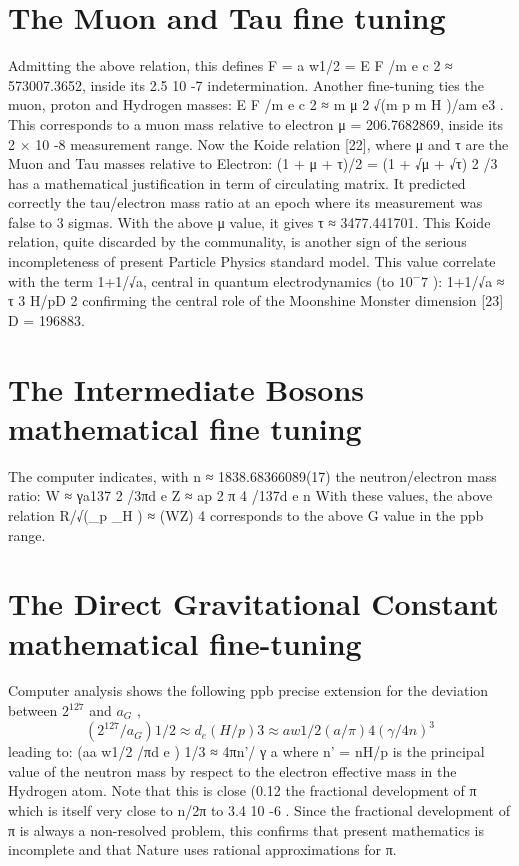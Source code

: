 \section {The Muon and Tau fine tuning}

Admitting the above relation, this defines F = a w1/2 = E F /m e c 2 ≈ 573007.3652, inside its 2.5 10 -7
indetermination. Another fine-tuning ties the muon, proton and Hydrogen masses: E F /m e c 2 ≈
m μ 2 √(m p m H )/am e3 . This corresponds to a muon mass relative to electron μ = 206.7682869, inside its
2 × 10 -8 measurement range.
Now the Koide relation [22], where μ and τ are the Muon and Tau masses relative to Electron:
(1 + μ + τ)/2 = (1 + √μ + √τ) 2 /3
has a mathematical justification in term of circulating matrix. It predicted correctly the tau/electron
mass ratio at an epoch where its measurement was false to 3 sigmas. With the above μ value, it
gives τ ≈ 3477.441701. This Koide relation, quite discarded by the communality, is another sign of
the serious incompleteness of present Particle Physics standard model. This value correlate with the
term 1+1/√a, central in quantum electrodynamics (to $10^-7$ ):
1+1/√a ≈ τ 3 H/pD 2
confirming the central role of the Moonshine Monster dimension [23] D = 196883.

\section {The Intermediate Bosons mathematical fine tuning}

The computer indicates, with n ≈ 1838.68366089(17) the neutron/electron mass ratio:
W ≈ γa137 2 /3πd e
Z ≈ ap 2 π 4 /137d e n
With these values, the above relation R/√(\lambdabar_p \lambdabar_H ) ≈ (WZ) 4 corresponds to the above G value in the
ppb range.

\section {The Direct Gravitational Constant mathematical fine-tuning}

Computer analysis shows the following ppb precise extension for the deviation between $2^127$ and
$a_G$ ,
$$(2^127 /a_G ) 1/2 ≈ d_e (H/p) 3 ≈ a w1/2 (a/ π ) 4 ( γ /4n)^3$$
leading to:
(aa w1/2 /πd e ) 1/3 ≈ 4πn'/ γ a
where n' = nH/p is the principal value of the neutron mass by respect to the electron effective mass
in the Hydrogen atom. Note that this is close (0.12 %
the fractional development of π which is itself very close to n/2π to 3.4 10 -6 . Since the fractional
development of π is always a non-resolved problem, this confirms that present mathematics is
incomplete and that Nature uses rational approximations for π.


